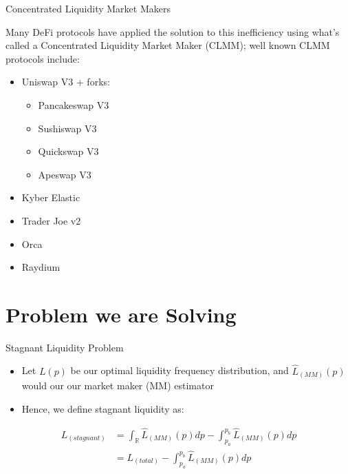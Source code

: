 \documentclass[10pt,xcolor=svgnames]{beamer} %
\begin{document}
\begin{frame}{Concentrated Liquidity Market Makers} 

Many DeFi protocols have applied the solution to this inefficiency using what's called a Concentrated Liquidity Market Maker (CLMM); well known CLMM protocols include:

\begin{itemize} 
\item Uniswap V3 + forks:
     \begin{itemize} 
        \item Pancakeswap V3
        \item Sushiswap V3
        \item Quickswap V3
        \item Apeswap V3
     \end{itemize}
\item Kyber Elastic 
\item Trader Joe v2
\item Orca
\item Raydium
\end{itemize}


\end{frame}

\section{Problem we are Solving}

\begin{frame}{Stagnant Liquidity Problem}

 
\begin{itemize}
  \item Let $L(p)$ be our optimal liquidity frequency distribution, and $\hat{L}_{(MM)}(p)$ would our our market maker (MM) estimator 
  \item Hence, we define stagnant liquidity as:
\end{itemize}

\begin{align*} 
L_{(stagnant)} &= \int_{\mathbb{R}}\hat{L}_{(MM)}(p)dp - \int_{p_{a}}^{p_{b}}\hat{L}_{(MM)}(p)dp\\ 
  &= L_{(total)} - \int_{p_{a}}^{p_{b}}\hat{L}_{(MM)}(p)dp
\end{align*}

\end{frame}
\end{document}
